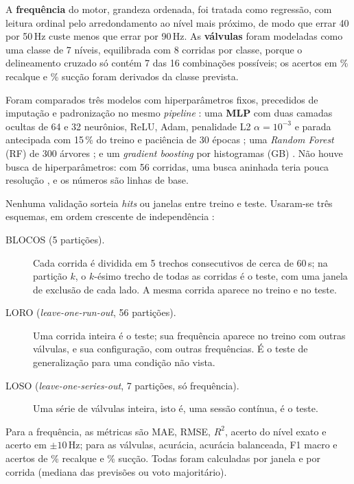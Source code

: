A \textbf{frequência} do motor, grandeza ordenada, foi tratada como regressão, com leitura ordinal pelo arredondamento ao nível mais próximo, de modo que errar 40 por 50\,Hz custe menos que errar por 90\,Hz. As \textbf{válvulas} foram modeladas como uma classe de 7 níveis, equilibrada com 8 corridas por classe, porque o delineamento cruzado só contém 7 das 16 combinações possíveis; os acertos em \% recalque e \% sucção foram derivados da classe prevista.

Foram comparados três modelos com hiperparâmetros fixos, precedidos de imputação e padronização no mesmo \textit{pipeline} \cite{pedregosa2011}: uma \textbf{MLP} com duas camadas ocultas de 64 e 32 neurônios, ReLU, Adam, penalidade L2 \(\alpha = 10^{-3}\) e parada antecipada com 15\,\% do treino e paciência de 30 épocas \cite{prechelt1998}; uma \textit{Random Forest} (RF) de 300 árvores \cite{breiman2001}; e um \textit{gradient boosting} por histogramas (GB) \cite{friedman2001}. Não houve busca de hiperparâmetros: com 56 corridas, uma busca aninhada teria pouca resolução \cite{varma2006}, e os números são linhas de base.

Nenhuma validação sorteia \textit{hits} ou janelas entre treino e teste. Usaram-se três esquemas, em ordem crescente de independência \cite{roberts2017}:
\begin{description}
	\item[BLOCOS (5 partições).] Cada corrida é dividida em 5 trechos consecutivos de cerca de 60\,s; na partição \(k\), o \(k\)-ésimo trecho de todas as corridas é o teste, com uma janela de exclusão de cada lado. A mesma corrida aparece no treino e no teste.
	\item[LORO (\textit{leave-one-run-out}, 56 partições).] Uma corrida inteira é o teste; sua frequência aparece no treino com outras válvulas, e sua configuração, com outras frequências. É o teste de generalização para uma condição não vista.
	\item[LOSO (\textit{leave-one-series-out}, 7 partições, só frequência).] Uma série de válvulas inteira, isto é, uma sessão contínua, é o teste.
\end{description}
Para a frequência, as métricas são MAE, RMSE, \(R^2\), acerto do nível exato e acerto em \(\pm 10\)\,Hz; para as válvulas, acurácia, acurácia balanceada, F1 macro e acertos de \% recalque e \% sucção. Todas foram calculadas por janela e por corrida (mediana das previsões ou voto majoritário).
